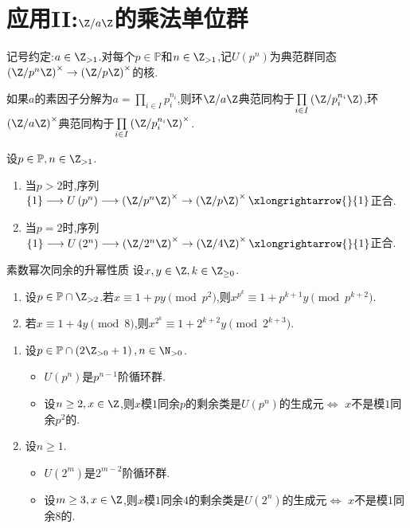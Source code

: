 \section{应用II:\texorpdfstring{$\Z/a\Z$}{Z/aZ}的乘法单位群}

记号约定:$a\in\Z_{>1}$.对每个$p\in\mathbb{P}$和$n\in\Z_{>1}$,记$U\left(p^{n}\right)$为典范群同态$\left(\Z/p^{n}\Z\right)^{\times}\to\left(\Z/p\Z\right)^{\times}$的核.

\begin{lemma}{}{}
	如果$a$的素因子分解为$a=\prod\limits_{i\in I}p_{i}^{n_{i}}$,则环$\Z/a\Z$典范同构于$\prod\limits_{i\in I}\left(\Z/p_{i}^{n_{i}}\Z\right)$,环$\left(\Z/a\Z\right)^{\times}$典范同构于$\prod\limits_{i\in I}\left(\Z/p_{i}^{n_{i}}\Z\right)^{\times}$.
\end{lemma}

\begin{lemma}{}{}
	设$p\in\mathbb{P},n\in\Z_{>1}$.
	\begin{enumerate}
		\item 当$p>2$时,序列$\left\{1\right\}\longrightarrow U\left(p^{n}\right)\longrightarrow\left(\Z/p^{n}\Z\right)^{\times}\to\left(\Z/p\Z\right)^{\times}\xlongrightarrow{}{1}$正合.
		\item 当$p=2$时,序列$\left\{1\right\}\longrightarrow U\left(2^{n}\right)\longrightarrow\left(\Z/2^{n}\Z\right)^{\times}\to\left(\Z/4\Z\right)^{\times}\xlongrightarrow{}{1}$正合.
	\end{enumerate}
\end{lemma}

\begin{lemma}{素数幂次同余的升幂性质}{}
	设$x,y\in\Z,k\in\Z_{\geq 0}$.
	\begin{enumerate}
		\item 设$p\in\mathbb{P}\cap\Z_{>2}$.若$x\equiv 1+py\pmod{p^{2}}$,则$x^{p^{k}}\equiv 1+p^{k+1}y\pmod{p^{k+2}}$.
		\item 若$x\equiv 1+4y\pmod{8}$,则$x^{2^{k}}\equiv 1+2^{k+2}y\pmod{2^{k+3}}$.
	\end{enumerate}
\end{lemma}

\begin{proposition}{}{}
	\begin{enumerate}
		\item 设$p\in\mathbb{P}\cap\left(2\Z_{>0}+1\right),n\in\N_{>0}$.
		\begin{itemize}
			\item $U\left(p^{n}\right)$是$p^{n-1}$阶循环群.
			\item 设$n\geq 2,x\in\Z$,则$x$模$1$同余$p$的剩余类是$U\left(p^{n}\right)$的生成元$\iff$ $x$不是模$1$同余$p^{2}$的.
		\end{itemize}
		\item 设$n\geq 1$.
		\begin{itemize}
			\item $U\left(2^{m}\right)$是$2^{m-2}$阶循环群.
			\item 设$m\geq 3,x\in\Z$,则$x$模$1$同余$4$的剩余类是$U\left(2^{n}\right)$的生成元$\iff$ $x$不是模$1$同余$8$的.
		\end{itemize}
	\end{enumerate}
\end{proposition}

